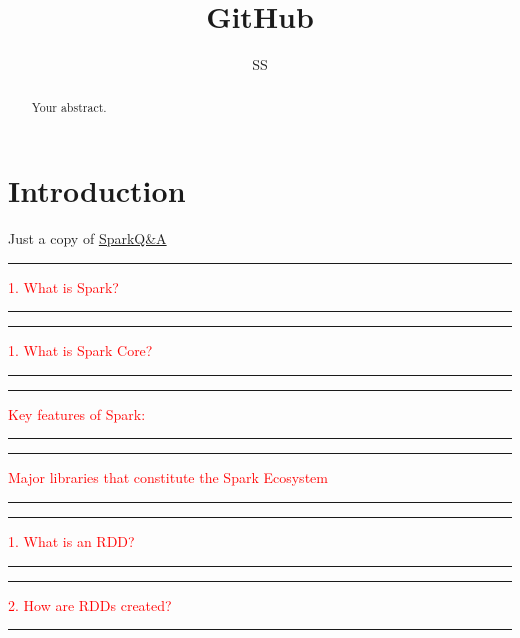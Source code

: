\documentclass{article}
\title{GitHub}
\author{SS}
\begin{document}
\maketitle

\begin{abstract}
Your abstract.
\end{abstract}

\section{Introduction}

Just a copy of \href{https://github.com/ankurchavda/SparkLearning#spark-learning-guide}{SparkQ\&A} \\

\noindent
{\color{red} \rule{\linewidth}{0.5mm}}
\textcolor{red}{1. What is Spark?} \\
\noindent
{\color{red} \rule{\linewidth}{0.5mm}}

\noindent
{\color{red} \rule{\linewidth}{0.5mm}}
\textcolor{red}{1. What is Spark Core?} \\
\noindent
{\color{red} \rule{\linewidth}{0.5mm}}

\noindent
{\color{red} \rule{\linewidth}{0.5mm}}
\textcolor{red}{Key features of Spark:} \\
\noindent
{\color{red} \rule{\linewidth}{0.5mm}}

\noindent
{\color{red} \rule{\linewidth}{0.5mm}}
\textcolor{red}{Major libraries that constitute the Spark Ecosystem} \\
\noindent
{\color{red} \rule{\linewidth}{0.5mm}}

\noindent
{\color{red} \rule{\linewidth}{0.5mm}}
\textcolor{red}{1. What is an RDD?} \\
\noindent
{\color{red} \rule{\linewidth}{0.5mm}}
\noindent
{\color{red} \rule{\linewidth}{0.5mm}}
\textcolor{red}{2. How are RDDs created?} \\
\noindent
{\color{red} \rule{\linewidth}{0.5mm}}
\end{document}
